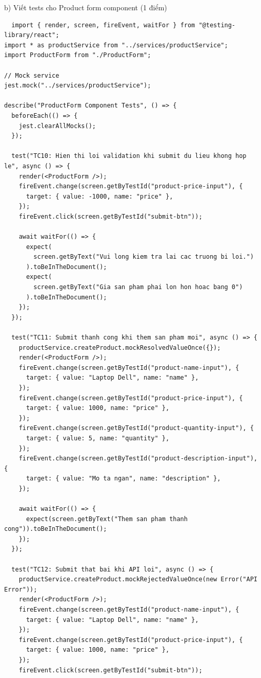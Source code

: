 \documentclass[a4paper,12pt]{article}
\begin{document}
b) Viết tests cho Product form component (1 điểm)
\begin{tcolorbox}[breakable, colback=green!5,colframe=black!50,title=ProductForm.test.js]
\begin{lstlisting}
  import { render, screen, fireEvent, waitFor } from "@testing-library/react";
import * as productService from "../services/productService";
import ProductForm from "./ProductForm";

// Mock service
jest.mock("../services/productService");

describe("ProductForm Component Tests", () => {
  beforeEach(() => {
    jest.clearAllMocks();
  });

  test("TC10: Hien thi loi validation khi submit du lieu khong hop le", async () => {
    render(<ProductForm />);
    fireEvent.change(screen.getByTestId("product-price-input"), {
      target: { value: -1000, name: "price" },
    });
    fireEvent.click(screen.getByTestId("submit-btn"));

    await waitFor(() => {
      expect(
        screen.getByText("Vui long kiem tra lai cac truong bi loi.")
      ).toBeInTheDocument();
      expect(
        screen.getByText("Gia san pham phai lon hon hoac bang 0")
      ).toBeInTheDocument();
    });
  });

  test("TC11: Submit thanh cong khi them san pham moi", async () => {
    productService.createProduct.mockResolvedValueOnce({});
    render(<ProductForm />);
    fireEvent.change(screen.getByTestId("product-name-input"), {
      target: { value: "Laptop Dell", name: "name" },
    });
    fireEvent.change(screen.getByTestId("product-price-input"), {
      target: { value: 1000, name: "price" },
    });
    fireEvent.change(screen.getByTestId("product-quantity-input"), {
      target: { value: 5, name: "quantity" },
    });
    fireEvent.change(screen.getByTestId("product-description-input"), {
      target: { value: "Mo ta ngan", name: "description" },
    });

    await waitFor(() => {
      expect(screen.getByText("Them san pham thanh cong")).toBeInTheDocument();
    });
  });

  test("TC12: Submit that bai khi API loi", async () => {
    productService.createProduct.mockRejectedValueOnce(new Error("API Error"));
    render(<ProductForm />);
    fireEvent.change(screen.getByTestId("product-name-input"), {
      target: { value: "Laptop Dell", name: "name" },
    });
    fireEvent.change(screen.getByTestId("product-price-input"), {
      target: { value: 1000, name: "price" },
    });
    fireEvent.click(screen.getByTestId("submit-btn"));


\end{lstlisting}
\end{tcolorbox}
\end{document}
